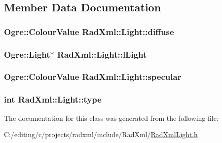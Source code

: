 \subsection{Member Data Documentation}
\hypertarget{class_rad_xml_1_1_light_ab2251755cb9f2afdd6557001d6e1778f}{
\subsubsection[{diffuse}]{\setlength{\rightskip}{0pt plus 5cm}Ogre\-::\-Colour\-Value Rad\-Xml\-::\-Light\-::diffuse}}\label{class_rad_xml_1_1_light_ab2251755cb9f2afdd6557001d6e1778f}
\hypertarget{class_rad_xml_1_1_light_a06ad758878e22d93769dc4fe20e8a608}{
\subsubsection[{l\-Light}]{\setlength{\rightskip}{0pt plus 5cm}Ogre\-::\-Light$\ast$ Rad\-Xml\-::\-Light\-::l\-Light}}\label{class_rad_xml_1_1_light_a06ad758878e22d93769dc4fe20e8a608}
\hypertarget{class_rad_xml_1_1_light_a7d88353ed778ab114681eac39b5155dd}{
\subsubsection[{specular}]{\setlength{\rightskip}{0pt plus 5cm}Ogre\-::\-Colour\-Value Rad\-Xml\-::\-Light\-::specular}}\label{class_rad_xml_1_1_light_a7d88353ed778ab114681eac39b5155dd}
\hypertarget{class_rad_xml_1_1_light_ad4d50df2952046bc45e0bce864ecc9b8}{
\subsubsection[{type}]{\setlength{\rightskip}{0pt plus 5cm}int Rad\-Xml\-::\-Light\-::type}}\label{class_rad_xml_1_1_light_ad4d50df2952046bc45e0bce864ecc9b8}


The documentation for this class was generated from the following file\-:\begin{DoxyCompactItemize}
\item 
C\-:/editing/c/projects/radxml/include/\-Rad\-Xml/\hyperlink{_rad_xml_light_8h}{Rad\-Xml\-Light.\-h}\end{DoxyCompactItemize}
